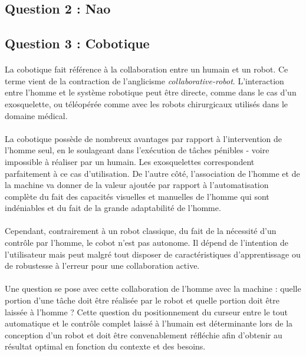 \subsection{Question 2 : Nao}


\subsection{Question 3 : Cobotique}


\paragraph{}
La cobotique fait référence à la collaboration entre un humain et un robot.
Ce terme vient de la contraction de l'anglicisme \emph{collaborative-robot}.
L'interaction entre l'homme et le système robotique peut être directe, comme dans
le cas d'un exosquelette, ou téléopérée comme avec les robots chirurgicaux
utilisés dans le domaine médical.

\paragraph{}
La cobotique possède de nombreux avantages par rapport à l'intervention de
l'homme seul, en le soulageant dans l'exécution de tâches pénibles - voire
impossible à réaliser par un humain. Les exosquelettes correspondent
parfaitement à ce cas d'utilisation.
De l'autre côté, l'association de l'homme et de la machine va donner de la
valeur ajoutée par rapport à l'automatisation complète du fait des capacités
visuelles et manuelles de l'homme qui sont indéniables et du fait de la grande
adaptabilité de l'homme.

\paragraph{}
Cependant, contrairement à un robot classique, du fait de la nécessité d'un
contrôle par l'homme, le cobot n'est pas autonome. Il dépend de l'intention de
l'utilisateur mais peut malgré tout disposer de caractéristiques d'apprentissage
ou de robustesse à l'erreur pour une collaboration active.

\paragraph{}
Une question se pose avec cette collaboration de l'homme avec la
machine : quelle portion d'une tâche doit être réalisée par le robot et quelle
portion doit être laissée à l'homme ?
Cette question du positionnement du curseur entre le tout automatique et le
contrôle complet laissé à l'humain est déterminante lors de la conception d'un
robot et doit être convenablement réfléchie afin d'obtenir au résultat optimal
en fonction du contexte et des besoins.

